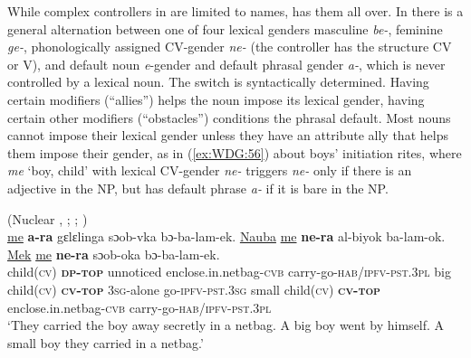 \documentclass[output=collectionpaper]{langsci/langscibook}
\begin{document}
While complex controllers in  are limited to names,  has them all over. In  there is a general alternation between one of four lexical genders \textendash{} masculine \textit{be-}, feminine \textit{ge-}, phonologically assigned CV-gender \textit{ne-} (the controller has the structure CV or V), and default noun \textit{e}-gender \textendash{} and default phrasal gender \textit{a-}, which is never controlled by a lexical noun. The switch is syntactically determined. Having certain modifiers (``allies'') helps the noun impose its lexical gender, having certain other modifiers (``obstacles'') conditions the phrasal default. Most nouns cannot impose their lexical gender unless they have an attribute ally that helps them impose their gender, as in (\ref{ex:WDG:56}) about boys' initiation rites, where \textit{me} `boy, child' with lexical CV-gender \textit{ne-} triggers \textit{ne-} only if there is an adjective in the NP, but has default phrase \textit{a-} if it is bare in the NP.

\ea\label{ex:WDG:56}
 (Nuclear , ; \citealt{Binzellnd}{}; \citealt[71]{Waelchli2018})\\
\gll \uline{me}	\textbf{a-ra}	gɛlɛlinga	sɔob-vka	bɔ-ba-lam-ek. \uline{Nauba}	\uline{me}	\textbf{ne-ra}	al-biyok	ba-lam-ok.	\uline{Mek}	\uline{me}	\textbf{ne-ra}	sɔob-oka	bɔ-ba-lam-ek.\\
child(\textsc{cv})	\textbf{\textsc{dp-top}}	unnoticed	enclose.in.netbag-\textsc{cvb}	carry-go-\textsc{hab/ipfv-pst.3pl} big	child(\textsc{cv})	\textbf{\textsc{cv-top}}	\textsc{3sg}-alone	go-\textsc{ipfv-pst.3sg} small	child(\textsc{cv})	\textbf{\textsc{cv-top}}	enclose.in.netbag-\textsc{cvb}	carry-go-\textsc{hab/ipfv-pst.3pl}\\
\glt `They carried the boy away secretly in a netbag. A big boy went by himself. A small boy they carried in a netbag.'\\
\z
\end{document}
